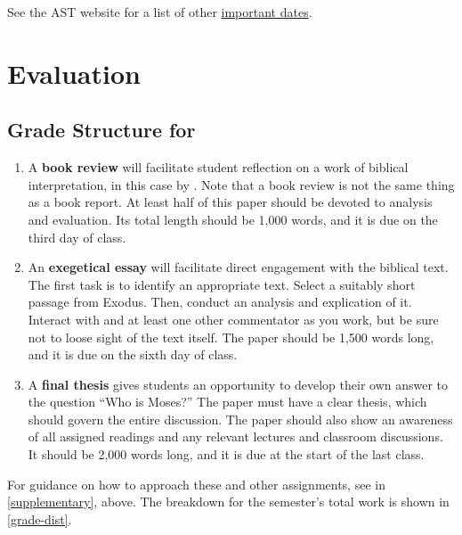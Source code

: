 \documentclass[titlepage]{article}
\begin{document}
See the AST website for a list of other \href{http://www.astheology.ns.ca/students/academic-dates.html}{important dates}.

\section{Evaluation}
\label{evaluation}

\subsection{Grade Structure for \ccode}
\label{structure}

\begin{enumerate}

	\item A \textbf{book review} will facilitate student reflection on a
	work of biblical interpretation, in this case by \cite{vonrad}. Note
	that a book review is not the same thing as a book report. At least
	half of this paper should be devoted to analysis and evaluation. Its
	total length should be 1,000 words, and it is due on the third day
	of class.

	\item An \textbf{exegetical essay} will facilitate direct engagement
	with the biblical text. The first task is to identify an appropriate
	text. Select a suitably short passage from Exodus. Then, conduct an
	analysis and explication of it. Interact with \cite{childs} and at
	least one other commentator as you work, but be sure not to loose
	sight of the text itself. The paper should be 1,500 words long, and
	it is due on the sixth day of class.

	\item A \textbf{final thesis} gives students an opportunity to
	develop their own answer to the question “Who is Moses?” The paper
	must have a clear thesis, which should govern the entire discussion.
	The paper should also show an awareness of all assigned readings and
	any relevant lectures and classroom discussions. It should be 2,000
	words long, and it is due at the start of the last class.


\end{enumerate}

For guidance on how to approach these and other assignments, see
\cite{rlgs} in \autoref{supplementary}, above. The breakdown for the
semester's total work is shown in \autoref{grade-dist}.
\end{document}
